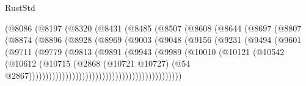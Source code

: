 \begin{lexlean}{RustStd}
\begin{coremodule}
{{{{{{{{{{{{{{{{{{{                              (@8086
                                (@8197
                                  (@8320
                                    (@8431
                                      (@8485
                                        (@8507
                                          (@8608
                                            (@8644
                                              (@8697
                                                (@8807
                                                  (@8874
                                                    (@8896
                                                      (@8928
                                                        (@8969
                                                          (@9003
                                                            (@9048
                                                              (@9156
                                                                (@9231
                                                                  (@9494
                                                                    (@9601
                                                                      (@9711
                                                                        (@9779
                                                                          (@9813
                                                                            (@9891
                                                                              (@9943
                                                                                (@9989
                                                                                  (@10010
                                                                                    (@10121
                                                                                      (@10542
                                                                                        (@10612
                                                                                          (@10715
                                                                                            (@2868
                                                                                              (@10721
                                                                                                @10727)
                                                                                              (@54
                                                                                                @2867))))))))))))))))))))))))))))))))))))))))))))))
}}}}}}}}}}}}}}}}}}}
\end{coremodule}
\end{lexlean}
